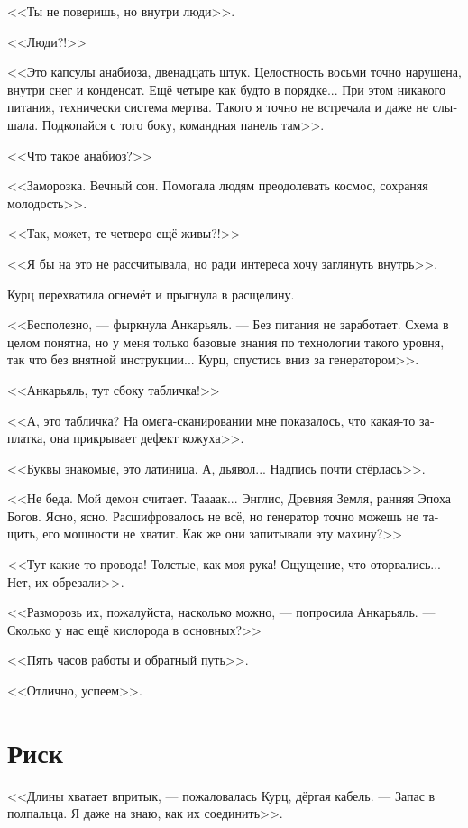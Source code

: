 \documentclass[a4paper,10pt,fleqn]{book}\usepackage{polyglossia}\setdefaultlanguage[babelshorthands=true]{russian}\setotherlanguage{english}\defaultfontfeatures{Ligatures=TeX,Mapping=tex-text}\usepackage{xcolor}\newcommand{\ml}[3]{#2}
\begin{document}
<<Ты не поверишь, но внутри люди>>.

<<Люди?!>>

<<Это капсулы анабиоза, двенадцать штук.
Целостность восьми точно нарушена, внутри снег и конденсат.
Ещё четыре как будто в порядке...
При этом никакого питания, технически система мертва.
Такого я точно не встречала и даже не слышала.
Подкопайся с того боку, командная панель там>>.

<<Что такое анабиоз?>>

<<Заморозка.
Вечный сон.
Помогала людям преодолевать космос, сохраняя молодость>>.

<<Так, может, те четверо ещё живы?!>>

<<Я бы на это не рассчитывала, но ради интереса хочу заглянуть внутрь>>.

Курц перехватила огнемёт и прыгнула в расщелину.

<<Бесполезно, --- фыркнула Анкарьяль.
--- Без питания не заработает.
Схема в целом понятна, но у меня только базовые знания по технологии такого уровня, так что без внятной инструкции...
Курц, спустись вниз за генератором>>.

<<Анкарьяль, тут сбоку табличка!>>

<<А, это табличка?
На омега-сканировании мне показалось, что какая-то заплатка, она прикрывает дефект кожуха>>.

<<Буквы знакомые, это латиница.
А, дьявол...
Надпись почти стёрлась>>.

<<Не беда.
Мой демон считает.
Таааак...
Энглис, Древняя Земля, ранняя Эпоха Богов.
Ясно, ясно.
Расшифровалось не всё, но генератор точно можешь не тащить, его мощности не хватит.
Как же они запитывали эту махину?>>

<<Тут какие-то провода!
Толстые, как моя рука!
Ощущение, что оторвались...
Нет, их обрезали>>.

<<Разморозь их, пожалуйста, насколько можно, --- попросила Анкарьяль.
--- Сколько у нас ещё кислорода в основных?>>

<<Пять часов работы и обратный путь>>.

<<Отлично, успеем>>.

\section{Риск}

<<Длины хватает впритык, --- пожаловалась Курц, дёргая кабель.
--- Запас в полпальца.
Я даже на знаю, как их соединить>>.
\end{document}
